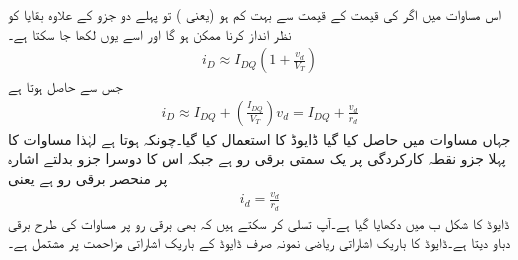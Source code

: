 اس مساوات میں اگر   کی قیمت  کے قیمت سے بہت کم ہو (یعنی ) تو پہلے دو جزو کے علاوہ بقایا کو نظر انداز کرنا ممکن ہو گا اور اسے یوں لکھا جا سکتا ہے۔
\begin{align}
i_D \approx I_{DQ} \left (1+\frac{v_d}{V_T} \right )
\end{align}
جس سے حاصل ہوتا ہے
\begin{align} \label{مساوات_ڈایوڈ_یکسمتی_اور_بدلتا_رو}
i_D \approx I_{DQ} +\left( \frac{I_{DQ}}{V_T} \right ) v_d = I_{DQ}+\frac{v_d}{r_d}
\end{align}
جہاں مساوات  میں حاصل کیا گیا ڈایوڈ کا   استعمال کیا گیا۔چونکہ  ہوتا ہے لہٰذا مساوات   کا پہلا جزو نقطہ کارکردگی پر یک سمتی برقی رو  ہے جبکہ اس کا دوسرا جزو بدلتے اشارہ   پر منحصر برقی رو  ہے یعنی
\begin{align} \label{مساوات_ڈایوڈ_باریک_ماڈل_کا_حصول}
i_d = \frac{v_d}{r_d}
\end{align}
ڈایوڈ کا   شکل  ب میں دکھایا گیا ہے۔آپ تسلی کر سکتے ہیں کہ  بھی برقی رو  پر  مساوات  کی طرح برقی دباو   دیتا ہے۔ڈایوڈ کا باریک اشاراتی ریاضی نمونہ صرف ڈایوڈ کے باریک اشاراتی مزاحمت  پر مشتمل ہے۔


